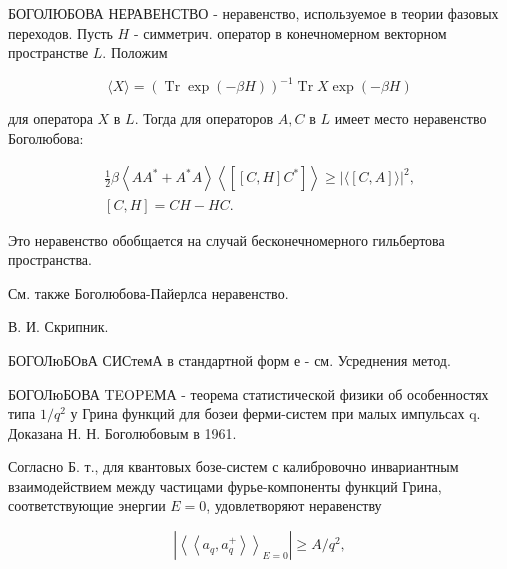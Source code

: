 \documentclass[10pt]{article}
\begin{document}
БОГОЛЮБОВА НЕРАВЕНСТВО - неравенство, используемое в теории фазовых переходов. Пусть $H$ - симметрич. оператор в конечномерном векторном пространстве $L$. Положим



\[

\langle X\rangle=(\operatorname{Tr} \exp (-\beta H))^{-1} \operatorname{Tr} X \exp (-\beta H)

\]



для оператора $X$ в $L$. Тогда для операторов $A, C$ в $L$ имеет место неравенство Боголюбова:



\[

\begin{gathered}

\frac{1}{2} \beta\left\langle A A^{*}+A^{*} A\right\rangle\left\langle\left[[C, H] C^{*}\right]\right\rangle \geqslant|\langle[C, A]\rangle|^{2}, \\

{[C, H]=C H-H C .}

\end{gathered}

\]



Это неравенство обобщается на случай бесконечномерного гильбертова пространства.



См. также Боголюбова-Пайерлса неравенство.



В. И. Скрипник.



БОГОЛюБОвА СИСтемА в стандартной форм е - см. Усреднения метод.



БОГОЛюБОВА TEOPEМА - теорема статистической физики об особенностях типа $1 / q^{2}$ у Грина функций для бозеи ферми-систем при малых импульсах q. Доказана Н. Н. Боголюбовым в 1961.



Согласно Б. т., для квантовых бозе-систем с калибровочно инвариантным взаимодействием между частицами фурье-компоненты функций Грина, соответствующие энергии $E=0$, удовлетворяют неравенству



\[

\left|\left\langle\left\langle a_{q}, a_{q}^{+}\right\rangle\right\rangle_{E=0}\right| \geqslant A / q^{2},

\]
\end{document}
